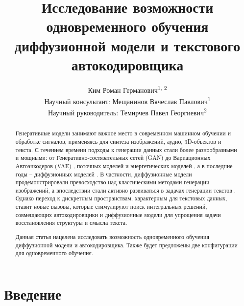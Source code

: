 \documentclass[12pt,a4paper]{article}
\title{Исследование возможности одновременного обучения диффузионной модели и текстового автокодировщика}
\author {
    Ким Роман Германович\textsuperscript{\rm 1, 2}\\
    Научный консультант: Мещанинов Вячеслав Павлович\textsuperscript{\rm 1} \\
    Научный руководитель: Темирчев Павел Георгиевич\textsuperscript{\rm 2}
   
}
\affil {
    \textsuperscript{\rm 1}Национальный исследовательский университет «Высшая школа экономики»\\
    \textsuperscript{\rm 2}Московский государственный университет имени М. В. Ломоносова\\
vmeshchaninov@hse.ru, rkim@hse.ru
}
\begin{document}
\maketitle

\begin{abstract}
Генеративные модели занимают важное место в современном машинном обучении и обработке сигналов, применяясь для синтеза изображений, аудио, 3D-объектов и текста. С течением времени подходы к генерации данных стали более разнообразными и мощными: от Генеративно-состязательных сетей (GAN) \cite{goodfellow2014generative} до Вариационных Автоэнкодеров (VAE) \cite{kingma2013auto,rezende2014stochastic}, поточных моделей \cite{grathwohl2018ffjord,chen2019residual} и энергетических моделей \cite{xiao2020vaebm}, а в последние годы – диффузионных моделей \cite{sohl2015deep,ho2020denoising}. В частности, диффузионные модели продемонстрировали превосходство над классическими методами генерации изображений, а впоследствии стали активно развиваться в задачах генерации текстов \cite{austin2021structured,diffusionlm,diffuseq,difformer,planner,dinoiser}. Однако переход к дискретным пространствам, характерным для текстовых данных, ставит новые вызовы, которые стимулируют поиск интегральных решений, совмещающих автокодировщики и диффузионные модели для упрощения задачи восстановления структуры и смысла текста.

Данная статья нацелена исследовать возможность одновременного обучения диффузионной модели и автокодировщика. Также будет предложены две конфигурации для одновременного обучения.
\end{abstract}

\section{Введение}
\end{document}

